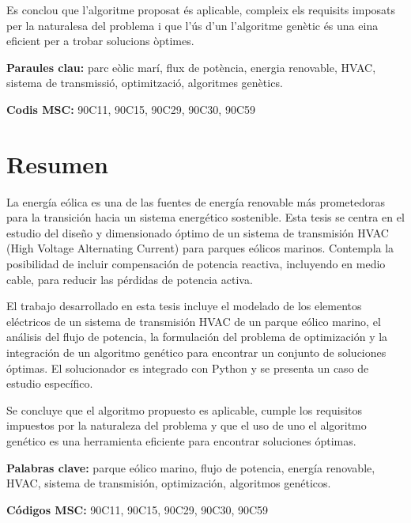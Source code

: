 \documentclass[a4paper,11pt, titlepage, twoside]{article}
\begin{document}
Es conclou que l'algoritme proposat és aplicable, compleix els requisits imposats per la naturalesa del problema i que l'ús d'un l'algoritme genètic és una eina eficient per a trobar solucions òptimes.


\textbf{Paraules clau:} parc eòlic marí, flux de potència, energia renovable, HVAC, sistema de transmissió, optimització, algoritmes genètics.


\textbf{Codis MSC:} 90C11, 90C15, 90C29, 90C30, 90C59
\section*{Resumen}

La energía eólica es una de las fuentes de energía renovable más prometedoras para la transición hacia un sistema energético sostenible. Esta tesis se centra en el estudio del diseño y dimensionado óptimo de un sistema de transmisión HVAC (High Voltage Alternating Current) para parques eólicos marinos. Contempla
la posibilidad de incluir compensación de potencia reactiva, incluyendo en medio cable, para reducir las pérdidas de potencia activa.

El trabajo desarrollado en esta tesis incluye el modelado de los elementos eléctricos de un sistema de transmisión HVAC de un parque eólico marino, el análisis del flujo de potencia, la formulación del problema de optimización
y la integración de un algoritmo genético para encontrar un conjunto de soluciones óptimas. El solucionador es integrado con Python y se presenta un caso de estudio específico.

Se concluye que el algoritmo propuesto es aplicable, cumple los requisitos impuestos por la naturaleza del problema y que el uso de uno el algoritmo genético es una herramienta eficiente para encontrar soluciones óptimas.

\textbf{Palabras clave:} parque eólico marino, flujo de potencia, energía renovable, HVAC, sistema de transmisión, optimización, algoritmos genéticos.


\textbf{Códigos MSC:} 90C11, 90C15, 90C29, 90C30, 90C59

\clearpage\null\newpage

\tableofcontents


\renewcommand{\nomname}{Abbreviations and Symbols}
\end{document}
